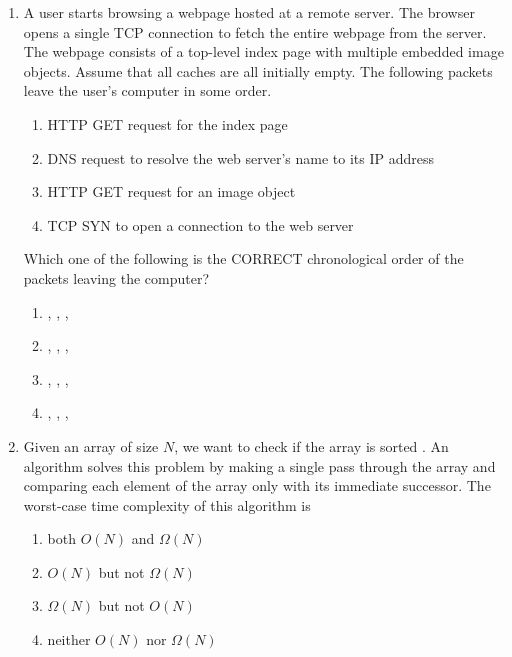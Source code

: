 \documentclass[a4paper, 11pt]{article}
\begin{document}
\begin{enumerate}
    \item A user starts browsing a webpage hosted at a remote server. The browser opens a single TCP connection to fetch the entire webpage from the server. The webpage consists of a top-level index page with multiple embedded image objects. Assume that all caches  are all initially empty. The following packets leave the user's computer in some order.
    
    \begin{enumerate}[label=(\roman*)]
        \item HTTP GET request for the index page
        \item DNS request to resolve the web server's name to its IP address
        \item HTTP GET request for an image object
        \item TCP SYN to open a connection to the web server
    \end{enumerate}
    
    Which one of the following is the CORRECT chronological order  of the packets leaving the computer?

    \begin{enumerate}
        \item {}, , , 
        \item {}, , , 
        \item {}, , , 
        \item {}, , , 
    \end{enumerate}
    \hfill{}

    \item Given an array of size $N$, we want to check if the array is sorted . An algorithm solves this problem by making a single pass through the array and comparing each element of the array only with its immediate successor. The worst-case time complexity of this algorithm is

    \begin{enumerate}
        \item both $O(N)$ and $\Omega(N)$
        \item $O(N)$ but not $\Omega(N)$
        \item $\Omega(N)$ but not $O(N)$
        \item neither $O(N)$ nor $\Omega(N)$
    \end{enumerate}
    \hfill{}


\end{enumerate}
\end{document}
